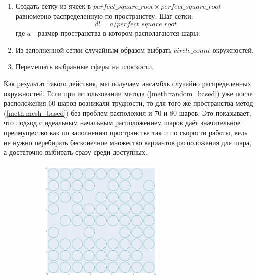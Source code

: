 \begin{enumerate}
\begin{enumerate}[label=\arabic*)]
        \item 
        Создать сетку из ячеек в $perfect\_square\_root \times perfect\_square\_root$ равномерно распределенную по пространству. Шаг сетки: 
        $$
        dl=a/perfect\_square\_root
        $$ 
        где $a$ - размер пространства в котором располагаются шары.
        \item
        Из заполненной сетки случайным образом выбрать $circle\_count$ окружностей.
        \item
        Перемешать выбранные сферы на плоскости.
    \end{enumerate}
    Как результат такого действия, мы получаем ансамбль случайно распределенных окружностей. Если при использовании метода (\ref{meth:random_based}) уже после расположения 60 шаров возникали трудности, то для того-же пространства метод (\ref{meth:mesh_based}) без проблем расположил и 70 и 80 шаров. Это показывает, что подход с идеальным начальным расположением шаров даёт значительное преимущество как по заполнению пространства так и по скорости работы, ведь не нужно перебирать бесконечное множество вариантов расположения для шара, а достаточно выбирать сразу среди доступных.
    \newcommand{\imgsize}{6cm}
    \begin{figure}[h!]
        \begin{subfigure}{0.49\textwidth}
            \centering
            \includegraphics [width=\imgsize,height=\imgsize]{figures/mesh_based/70_before_shuffeling.png}

\end{subfigure}
\end{figure}
\end{enumerate}
